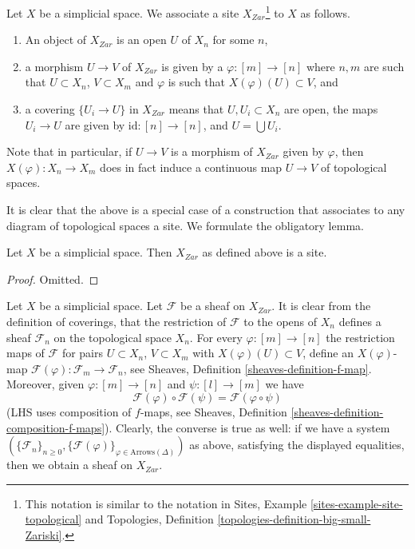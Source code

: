 \medskip\noindent
Let $X$ be a simplicial space. We associate a site
$X_{Zar}$\footnote{This notation is similar to the notation in
Sites, Example \ref{sites-example-site-topological}
and
Topologies, Definition \ref{topologies-definition-big-small-Zariski}.}
to $X$ as follows.
\begin{enumerate}
\item An object of $X_{Zar}$ is an open $U$ of $X_n$ for some $n$,
\item a morphism $U \to V$ of $X_{Zar}$ is given by a
$\varphi : [m] \to [n]$ where $n, m$ are such that
$U \subset X_n$, $V \subset X_m$ and $\varphi$ is such that
$X(\varphi)(U) \subset V$, and
\item a covering $\{U_i \to U\}$ in $X_{Zar}$ means
that $U, U_i \subset X_n$ are open, the maps $U_i \to U$ are
given by $\text{id} : [n] \to [n]$, and $U = \bigcup U_i$.
\end{enumerate}
Note that in particular, if $U \to V$ is a morphism of $X_{Zar}$
given by $\varphi$, then $X(\varphi) : X_n \to X_m$ does in fact
induce a continuous map $U \to V$ of topological spaces.

\noindent
It is clear that the above is a special case of a construction that
associates to any diagram of topological spaces a site. We formulate
the obligatory lemma.

\begin{lemma}
\label{lemma-simplicial-site}
Let $X$ be a simplicial space. Then $X_{Zar}$
as defined above is a site.
\end{lemma}

\begin{proof}
Omitted.
\end{proof}

\noindent
Let $X$ be a simplicial space. Let $\mathcal{F}$ be a sheaf on $X_{Zar}$.
It is clear from the definition of coverings, that the restriction
of $\mathcal{F}$ to the opens of $X_n$ defines a sheaf $\mathcal{F}_n$
on the topological space $X_n$. For every $\varphi : [m] \to [n]$ the
restriction maps of $\mathcal{F}$ for pairs $U \subset X_n$, $V \subset X_m$
with $X(\varphi)(U) \subset V$, define an $X(\varphi)$-map
$\mathcal{F}(\varphi) : \mathcal{F}_m \to \mathcal{F}_n$, see
Sheaves, Definition \ref{sheaves-definition-f-map}.
Moreover, given $\varphi : [m] \to [n]$ and $\psi : [l] \to [m]$
we have
$$
\mathcal{F}(\varphi) \circ \mathcal{F}(\psi) =
\mathcal{F}(\varphi \circ \psi)
$$
(LHS uses composition of $f$-maps, see
Sheaves, Definition \ref{sheaves-definition-composition-f-maps}).
Clearly, the converse is true as well: if we have a system
$(\{\mathcal{F}_n\}_{n \geq 0},
\{\mathcal{F}(\varphi)\}_{\varphi \in \text{Arrows}(\Delta)})$
as above, satisfying the displayed equalities,
then we obtain a sheaf on $X_{Zar}$.

